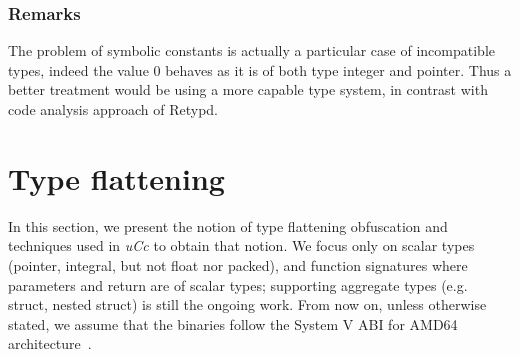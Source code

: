 \documentclass[compsoc,conference,a4paper,10pt,times]{IEEEtran}
\begin{document}
\subsubsection*{Remarks}
The problem of symbolic constants is actually a particular case of incompatible types, indeed the value 
$0$ behaves as it is of both type integer and pointer. Thus a better treatment would be using a more
capable type system, in contrast with code analysis approach of Retypd.




\section{Type flattening}
\noindent
In this section, we present the notion of type flattening obfuscation and techniques 
used in \emph{uCc} to obtain that notion. We focus only on scalar types (pointer, integral, 
but not float nor packed), and function signatures where parameters and return are of scalar types; supporting aggregate types
(e.g. struct, nested struct) is still the ongoing work. From now on, unless otherwise stated, 
we assume that the binaries follow the System V ABI for AMD64 architecture~\cite{lu_system_nodate}.
\end{document}
